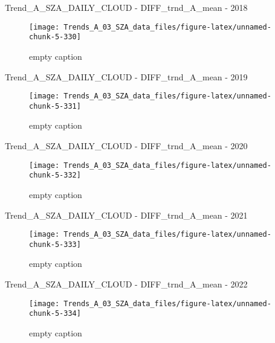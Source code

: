 \documentclass[
  10pt,
  a4paper,oneside]{article}
\begin{document}
Trend\_A\_SZA\_DAILY\_CLOUD - DIFF\_trnd\_A\_mean - 2018

\begin{figure}[!ht]

{\centering \texttt{[image: Trends\_A\_03\_SZA\_data\_files/figure-latex/unnamed-chunk-5-330]} 

}

\caption{ empty caption }\label{fig:unnamed-chunk-5-330}
\end{figure}

Trend\_A\_SZA\_DAILY\_CLOUD - DIFF\_trnd\_A\_mean - 2019

\begin{figure}[!ht]

{\centering \texttt{[image: Trends\_A\_03\_SZA\_data\_files/figure-latex/unnamed-chunk-5-331]} 

}

\caption{ empty caption }\label{fig:unnamed-chunk-5-331}
\end{figure}

Trend\_A\_SZA\_DAILY\_CLOUD - DIFF\_trnd\_A\_mean - 2020

\begin{figure}[!ht]

{\centering \texttt{[image: Trends\_A\_03\_SZA\_data\_files/figure-latex/unnamed-chunk-5-332]} 

}

\caption{ empty caption }\label{fig:unnamed-chunk-5-332}
\end{figure}

Trend\_A\_SZA\_DAILY\_CLOUD - DIFF\_trnd\_A\_mean - 2021

\begin{figure}[!ht]

{\centering \texttt{[image: Trends\_A\_03\_SZA\_data\_files/figure-latex/unnamed-chunk-5-333]} 

}

\caption{ empty caption }\label{fig:unnamed-chunk-5-333}
\end{figure}

Trend\_A\_SZA\_DAILY\_CLOUD - DIFF\_trnd\_A\_mean - 2022

\begin{figure}[!ht]

{\centering \texttt{[image: Trends\_A\_03\_SZA\_data\_files/figure-latex/unnamed-chunk-5-334]} 

}

\caption{ empty caption }\label{fig:unnamed-chunk-5-334}
\end{figure}
\end{document}
